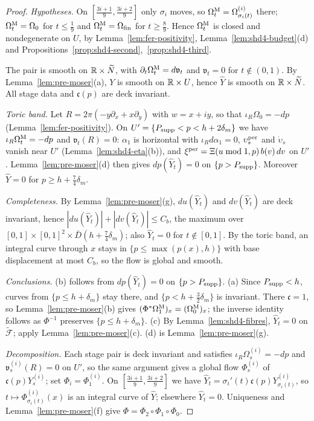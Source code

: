 \begin{proof}
\emph{Hypotheses.} On $[\frac{3i+1}9,\frac{3i+2}9]$ only $\sigma_i$ moves, so $\Omega^{\rm M}_t=\Omega^{(i)}_{\sigma_i(t)}$ there; $\Omega^{\rm M}_t=\Omega_0$ for $t\le\frac19$ and $\Omega^{\rm M}_t=\Omega_{\rm fin}$ for $t\ge\frac89$. Hence $\Omega^{\rm M}_t$ is closed and nondegenerate on $U$, by Lemma~\ref{lem:fer-positivity}, Lemma~\ref{lem:shd4-budget}(d) and Propositions~\ref{prop:shd4-second},~\ref{prop:shd4-third}.

The pair is smooth on $\mathbb{R}\times\widetilde N$, with $\partial_t\Omega^{\rm M}_t=d\mathfrak v_t$ and $\mathfrak v_t=0$ for $t\notin(0,1)$. By Lemma~\ref{lem:pre-moser}(a), $Y$ is smooth on $\mathbb{R}\times U$, hence $\widehat Y$ is smooth on $\mathbb{R}\times\widetilde N$. All stage data and $\mathfrak c(p)$ are deck invariant.

\emph{Toric band.} Let $R=2\pi(-y\partial_x+x\partial_y)$ with $w=x+iy$, so that $\iota_R\Omega_0=-dp$ (Lemma~\ref{lem:fer-positivity}). On $U'=\{P_{\rm supp}<p<h+2\delta_m\}$ we have $\iota_R\Omega^{\rm M}_t=-dp$ and $\mathfrak v_t(R)=0$: $\alpha_1$ is horizontal with $\iota_Rd\alpha_1=0$, $\upsilon^{\rm per}_s$ and $\dot\upsilon_s$ vanish near $U'$ (Lemma~\ref{lem:shd4-eta}(b)), and $\xi^{\rm per}=\Xi(u\bmod1,p)\,b(v)\,dv$ on $U'$. Lemma~\ref{lem:pre-moser}(d) then gives $dp(\widehat Y_t)=0$ on $\{p>P_{\rm supp}\}$. Moreover $\widehat Y=0$ for $p\ge h+\frac74\delta_m$.

\emph{Completeness.} By Lemma~\ref{lem:pre-moser}(g), $du(\widehat Y_t)$ and $dv(\widehat Y_t)$ are deck invariant, hence $|du(\widehat Y_t)|+|dv(\widehat Y_t)|\le C_b$, the maximum over $[0,1]\times[0,1]^2\times\bar D(h+\frac74\delta_m)$; also $\widehat Y_t=0$ for $t\notin[0,1]$. By the toric band, an integral curve through $x$ stays in $\{p\le\max(p(x),h)\}$ with base displacement at most $C_b$, so the flow is global and smooth.

\emph{Conclusions.}
(b) follows from $dp(\widehat Y_t)=0$ on $\{p>P_{\rm supp}\}$.
(a) Since $P_{\rm supp}<h$, curves from $\{p\le h+\delta_m\}$ stay there, and $\{p<h+\frac32\delta_m\}$ is invariant. There $\mathfrak c=1$, so Lemma~\ref{lem:pre-moser}(b) gives $(\Phi^*\Omega^{\rm M}_1)_x=(\Omega^{\rm M}_0)_x$; the inverse identity follows as $\Phi^{-1}$ preserves $\{p\le h+\delta_m\}$.
(c) By Lemma~\ref{lem:shd4-fibres}, $\widehat Y_t=0$ on $\widetilde{\mathcal F}$; apply Lemma~\ref{lem:pre-moser}(c).
(d) is Lemma~\ref{lem:pre-moser}(g).

\emph{Decomposition.} Each stage pair is deck invariant and satisfies $\iota_R\Omega^{(i)}_s=-dp$ and $\mathfrak v^{(i)}_s(R)=0$ on $U'$, so the same argument gives a global flow $\Phi^{(i)}_s$ of $\mathfrak c(p)Y^{(i)}_s$; set $\Phi_i=\Phi^{(i)}_1$. On $[\frac{3i+1}9,\frac{3i+2}9]$ we have $\widehat Y_t=\sigma_i'(t)\mathfrak c(p)Y^{(i)}_{\sigma_i(t)}$, so $t\mapsto\Phi^{(i)}_{\sigma_i(t)}(x)$ is an integral curve of $\widehat Y$; elsewhere $\widehat Y_t=0$. Uniqueness and Lemma~\ref{lem:pre-moser}(f) give $\Phi=\Phi_2\circ\Phi_1\circ\Phi_0$.
\end{proof}

